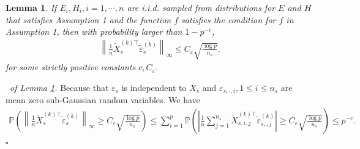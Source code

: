 \documentclass[12pt]{article}
\newtheorem{lemma}{Lemma}
\newenvironment{pf}{{\noindent \it Proof}\ }{\hfill $\square$\par}
\begin{document}
\begin{lemma}
    \label{lem:trimed_noise_error}
    If $E_i,H_i,i=1,\cdots,n$ are i.i.d. sampled from distributions for $E$ and $H$ that satisfies Assumption 1 and the function $f$ satisfies the condition for $f$ in Assumption 1, then with probability larger than $1 - p^{-c}$,
    \begin{align*}
        \left\|\frac{1}{n}\tilde{X}_s^{(k)\top}\tilde{\varepsilon}_s^{(k)} \right\|_{\infty}\le C_\varepsilon\sqrt{\frac{\log p}{n_s}}. 
    \end{align*}
    for some strictly positive constants $c, C_\varepsilon$. 
\end{lemma}

\begin{pf}{\it of Lemma \ref{lem:trimed_noise_error}. }
    Because that $\varepsilon_s$ is independent to $X_s$ and $\varepsilon_{s,\cdot,i},1\le i\le n_s$ are mean zero sub-Gaussian random variables. We have 
    \begin{align*}
        \mathbb{P}\left(\left\|\frac{1}{n}\tilde{X}_s^{(k)\top}\tilde{\varepsilon}_s^{(k)} \right\|_{\infty}\ge C_\varepsilon\sqrt{\frac{\log p}{n_s}}\right) \le \sum_{i=1}^p \mathbb{P}\left(\left|\frac{1}{n}\sum_{j=1}^{n_s}\tilde{X}_{s,i,j}^{(k)\top}\tilde{\varepsilon}_{s,,j}^{(k)} \right|\ge C_\varepsilon\sqrt{\frac{\log p}{n_s}}\right) \le p^{-c}. 
    \end{align*}
\end{pf}
\end{document}
